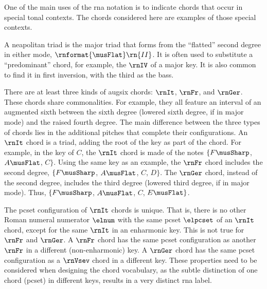
One of the main uses of the \gls{rna} notation is to
indicate chords that occur in special tonal contexts. The
chords considered here are examples of those special
contexts.


A \gls{neapolitan} triad is the major triad that forms from
the ``flatted'' second degree in either mode,
$\rnformat{\musFlat}\rn{II}$. It is often used to substitute
a ``predominant'' chord, for example, the $\rnIV$ of a major
key. It is also common to find it in first inversion, with
the third as the bass.


There are at least three kinds of \gls{augsix} chords:
$\rnIt$, $\rnFr$, and $\rnGer$. These chords share
commonalities. For example, they all feature an interval of
an augmented sixth between the sixth degree (lowered sixth
degree, if in major mode) and the raised fourth degree. The
main difference between the three types of chords lies in
the additional pitches that complete their configurations.
An $\rnIt$ chord is a triad, adding the root of the key as
part of the chord. For example, in the key of $C$, the
$\rnIt$ chord is made of the notes $\{F\musSharp$,
$A\musFlat$, $C\}$. Using the same key as an example, the
$\rnFr$ chord includes the second degree, $\{F\musSharp$,
$A\musFlat$, $C$, $D\}$. The $\rnGer$ chord, instead of the
second degree, includes the third degree (lowered third
degree, if in major mode). Thus, $\{F\musSharp$,
$A\musFlat$, $C$, $E\musFlat\}$.

The \gls{pcset} configuration of $\rnIt$ chords is unique.
That is, there is no other Roman numeral numerator $\elnum$
with the same \gls{pcset} $\elpcset$ of an $\rnIt$ chord,
except for the same $\rnIt$ in an enharmonic key. This is
not true for $\rnFr$ and $\rnGer$. A $\rnFr$ chord has the
same \gls{pcset} configuration as another $\rnFr$ in a
different (non-enharmonic) key. A $\rnGer$ chord has the
same \gls{pcset} configuration as a $\rnVsev$ chord in a
different key. These properties need to be considered when
designing the chord vocabulary, as the subtle distinction of
one chord (\gls{pcset}) in different keys, results in a very
distinct \gls{rna} label.
